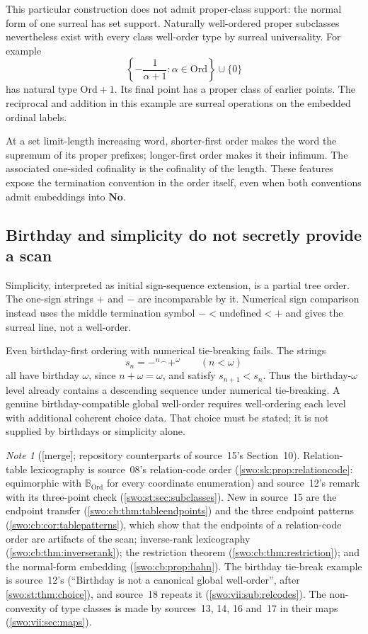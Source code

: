 \documentclass[11pt]{article}
\theoremstyle{definition}
\theoremstyle{remark}
\newtheorem{note}[note]{Note}
\newcommand{\No}{\mathbf{No}}
\newcommand{\Ord}{\mathrm{Ord}}
\newcommand{\B}{\mathbb B}
\newcommand{\concat}{\mathbin{{}^\frown}}
\newcommand{\merge}{\textsf{[merge]}}
\begin{document}
This particular construction does not admit proper-class support: the
normal form of one surreal has set support. Naturally well-ordered
proper subclasses nevertheless exist with every class well-order type
by surreal universality. For example
\[
 \left\{-\frac{1}{\alpha+1}:\alpha\in\Ord\right\}\cup\{0\}
\]
has natural type $\Ord+1$. Its final point has a proper class of
earlier points. The reciprocal and addition in this example are surreal
operations on the embedded ordinal labels.

At a set limit-length increasing word, shorter-first order makes the
word the supremum of its proper prefixes; longer-first order makes it
their infimum. The associated one-sided cofinality is the cofinality
of the length. These features expose the termination convention in the
order itself, even when both conventions admit embeddings into $\No$.

\subsection{Birthday and simplicity do not secretly provide a scan}

Simplicity, interpreted as initial sign-sequence extension, is a partial
tree order. The one-sign strings $+$ and $-$ are incomparable by it.
Numerical sign comparison instead uses the middle termination symbol
$-<\text{undefined}<+$ and gives the surreal line, not a well-order.

Even birthday-first ordering with numerical tie-breaking fails. The
strings
\[
 s_n=-^n\concat+^\omega\qquad(n<\omega)
\]
all have birthday $\omega$, since $n+\omega=\omega$, and satisfy
$s_{n+1}<s_n$. Thus the birthday-$\omega$ level already contains a
descending sequence under numerical tie-breaking. A genuine
birthday-compatible global well-order requires well-ordering each level
with additional coherent choice data. That choice must be stated; it is
not supplied by birthdays or simplicity alone.

\begin{note}[\merge; repository counterparts of source~15's Section~10]\label{swo:vii:note:alt}
Relation-table lexicography is source~08's relation-code order
(\cref{swo:sk:prop:relationcode}: equimorphic with $\B_{\Ord}$ for every
coordinate enumeration) and source~12's remark with its three-point check
(\cref{swo:st:sec:subclasses}). New in source~15 are the endpoint transfer
(\cref{swo:cb:thm:tableendpoints}) and the three endpoint patterns
(\cref{swo:cb:cor:tablepatterns}), which show that the endpoints of a
relation-code order are artifacts of the scan; inverse-rank lexicography
(\cref{swo:cb:thm:inverserank}); the restriction theorem
(\cref{swo:cb:thm:restriction}); and the normal-form embedding
(\cref{swo:cb:prop:hahn}). The birthday tie-break example is source~12's
(``Birthday is not a canonical global well-order'', after
\cref{swo:st:thm:choice}), and source~18 repeats it
(\cref{swo:vii:sub:relcodes}). The non-convexity of type classes is made by
sources~13, 14, 16 and~17 in their maps (\cref{swo:vii:sec:maps}).
\end{note}
\end{document}
